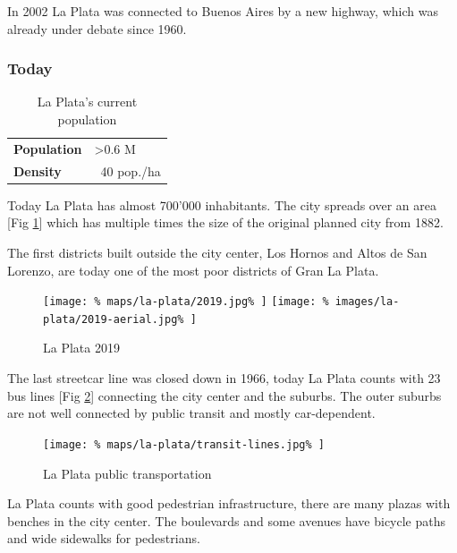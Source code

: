 \documentclass{article}
\begin{document}
\begin{multicols}{2}
			In 2002 La Plata was connected to Buenos Aires by a new highway, which was already under debate since 1960.		
			
			
			\subsubsection{Today}
			
			\begin{table}[H]			
				\centering
				\caption{La Plata's current population}
				\label{table:la-plata-population}
				\begin{tabular}{|l|l|}
					\hline
					\textbf{Population} & \textgreater 0.6 M \\
					\textbf{Density}    & ~40 pop./ha \\
					\hline
				\end{tabular}
			\end{table}
			
			Today La Plata has almost 700'000 inhabitants. The city spreads over an area [Fig \ref{fig:map:la-plata-2019}] which has multiple times the size of the original planned city from 1882.
						
			The first districts built outside the city center, Los Hornos and Altos de San Lorenzo, are today one of the most poor districts of Gran La Plata.
			
			\begin{figure}[H]
				\texttt{[image: \%
					maps/la-plata/2019.jpg\%
				]}
				\texttt{[image: \%
					images/la-plata/2019-aerial.jpg\%
				]}
				\caption{La Plata 2019 \cite{OpenStreetMap:LaPlata}}
				\label{fig:map:la-plata-2019}
			\end{figure}

			The last streetcar line was closed down in 1966, today La Plata counts with 23 bus lines [Fig \ref{fig:map:la-plata-transit}] connecting the city center and the suburbs.
			The outer suburbs are not well connected by public transit and mostly car-dependent.
			
			\begin{figure}[H]
				\texttt{[image: \%
					maps/la-plata/transit-lines.jpg\%
				]}
				\caption{La Plata public transportation  \cite{OpenStreetMap:LaPlata}}
				\label{fig:map:la-plata-transit}
			\end{figure}
			
			La Plata counts with good pedestrian infrastructure, there are many plazas with benches in the city center. The boulevards and some avenues have bicycle paths and wide sidewalks for pedestrians.
			

\end{multicols}
\end{document}
